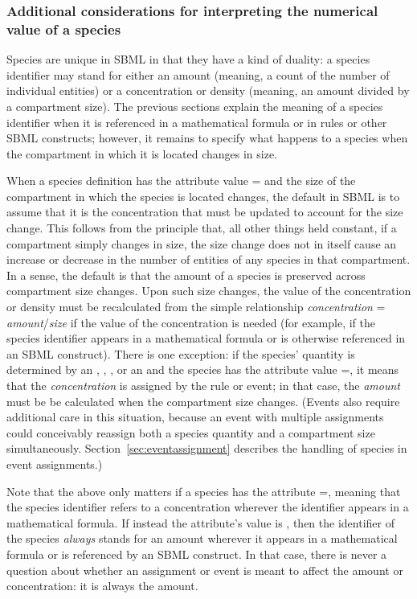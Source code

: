 \subsubsection{Additional considerations for interpreting the
  numerical value of a species}
\label{sec:species-meaning}

Species are unique in SBML in that they have a kind of duality: a
species identifier may stand for either an amount (meaning, a
count of the number of individual entities) or a concentration or
density (meaning, an amount divided by a compartment size).  The
previous sections explain the meaning of a species identifier when
it is referenced in a mathematical formula or in rules or other
SBML constructs; however, it remains to specify what happens to a
species when the compartment in which it is located changes in size.

When a species definition has the attribute value
= and the size of the
compartment in which the species is located changes, the default
in SBML is to assume that it is the concentration that must be
updated to account for the size change.  This follows from the
principle that, all other things held constant, if a compartment
simply changes in size, the size change does not in itself cause
an increase or decrease in the number of entities of any species
in that compartment.  In a sense, the default is that the amount
of a species is preserved across compartment size changes.  Upon
such size changes, the value of the concentration or density must
be recalculated from the simple relationship \emph{concentration}
= \emph{amount}/\emph{size} if the value of the concentration is
needed (for example, if the species identifier appears in a
mathematical formula or is otherwise referenced in an SBML
construct).  There is one exception: if the species' quantity is
determined by an \AssignmentRule, \RateRule, \AlgebraicRule, or an
\EventAssignment and the species has the attribute value
=, it means that the
\emph{concentration} is assigned by the rule or event; in that
case, the \emph{amount} must be be calculated when the compartment
size changes.  (Events also require additional care in this
situation, because an event with multiple assignments could
conceivably reassign both a species quantity and a compartment
size simultaneously.  Section~\ref{sec:eventassignment} describes
the handling of species in event assignments.)

Note that the above only matters if a species has the attribute
=, meaning that the
species identifier refers to a concentration wherever the
identifier appears in a mathematical formula.  If instead the
attribute's value is , then the identifier of the
species \emph{always} stands for an amount wherever it appears in
a mathematical formula or is referenced by an SBML construct.  In
that case, there is never a question about whether an assignment
or event is meant to affect the amount or concentration: it is
always the amount.

